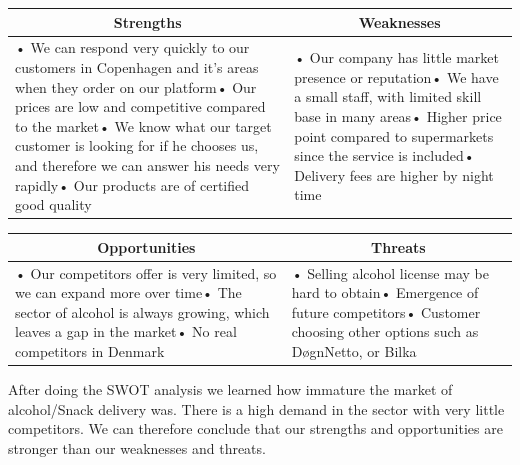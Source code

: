 \documentclass[12p]{article}
\begin{document}
\begin{table}[H]
  \centering
    \begin{tabular}{|p{}|p{}|}
    \hline
    \multicolumn{1}{|c|}{\textbf{Strengths}} & \multicolumn{1}{c|}{\textbf{Weaknesses}} \\
    \hline
    {• We can respond very quickly to our customers in Copenhagen and it's areas when they order on our platform\newline{}• Our prices are low and competitive compared to the market\newline{}• We know what our target customer is looking for if he chooses us, and therefore we can answer his needs very rapidly\newline{}• Our products are of certified good quality} & • Our company has little market presence or reputation\newline{}• We have a small staff, with limited skill base in many areas\newline{}• Higher price point compared to supermarkets since the service is included\newline{}• Delivery fees are higher by night time \\
    \hline
    \end{tabular}
  \label{tab:swot_one}
\end{table}

\begin{table}[H]
  \centering
    \begin{tabular}{|p{}|p{}|}
    \hline
    \multicolumn{1}{|c|}{\textbf{Opportunities}} & \multicolumn{1}{c|}{\textbf{Threats}} \\
    \hline
    {• Our competitors offer is very limited, so we can expand more over time\newline{}• The sector of alcohol is always growing, which leaves a gap in the market\newline{}• No real competitors in Denmark} & • Selling alcohol license may be hard to obtain\newline{}• Emergence of future competitors\newline{}• Customer choosing other options such as DøgnNetto, or Bilka \\
    \hline
    \end{tabular}
  \label{tab:swot_two}
\end{table}

After doing the SWOT analysis we learned how immature the market of alcohol/Snack delivery was. There is a high demand in the sector %
with very little competitors.
We can therefore conclude that our strengths and opportunities are stronger than our weaknesses and threats. 
\end{document}
